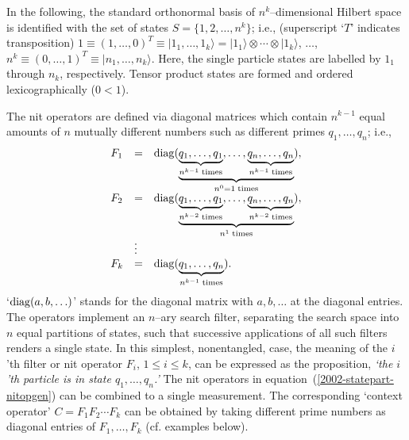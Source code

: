 \documentclass{article}
\begin{document}
In the following, the standard orthonormal basis of
$n^k$--dimensional Hilbert space is identified with the set of states $S=\{1,2,\ldots ,n^k\}$; i.e.,
(superscript `$T$' indicates transposition)
$
1 \equiv (1,\ldots,0)^T\equiv \mid 1_1,\ldots ,1_k\rangle = \mid 1_1\rangle \otimes \cdots \otimes \mid 1_k\rangle
$,
$\ldots $,
$
n^k \equiv (0,\ldots,1)^T\equiv \mid n_1,\ldots ,n_k\rangle
$.
Here, the single particle states are labelled by $1_1$ through $n_k$, respectively.
Tensor product states are formed and ordered lexicographically ($0<1$).


The nit operators are defined via diagonal matrices
which contain $n^{k-1}$ equal amounts of $n$ mutually different numbers
such as different primes $q_1,\ldots ,q_n$; i.e.,
\begin{equation}
\begin{array}{llll}
F_1&=& {\rm diag} (\underbrace{\underbrace{q_1,\ldots ,q_1}_{n^{k-1}\;{\rm times}},\ldots ,\underbrace{q_n,\ldots ,q_n}_{n^{k-1}\;{\rm times}}}_{n^0=1\;{\rm times}}),\\
F_2&=& {\rm diag} (\underbrace{\underbrace{q_1,\ldots ,q_1}_{n^{k-2}\;{\rm times}},\ldots ,\underbrace{q_n,\ldots ,q_n}_{n^{k-2}\;{\rm times}}}_{n^1\;{\rm times}}),\\
  &\vdots&\\
F_k&=& {\rm diag} (\underbrace{q_1,\ldots ,q_n}_{n^{k-1}\;{\rm times}}).
\end{array}
\label{2002-statepart-nitopgen}
\end{equation}
`${\rm diag}(a,b,\ldots )$' stands for the diagonal matrix with $a,b,\ldots $
at the diagonal entries.
The operators implement an $n$--ary search filter,
separating the search space into $n$ equal partitions of states,
such that successive applications of all such filters
renders a single state.
In this simplest, nonentangled, case,
the meaning of the $i$'th filter or nit operator $F_i$, $1\le i\le k$,
can be expressed as the proposition,
{\em `the $i$'th particle is in state $q_1, \ldots ,q_n$.'}
The nit operators in equation~(\ref{2002-statepart-nitopgen}) can be combined to a single
measurement. The corresponding `context operator' $C=F_1 F_2 \cdots F_k$ can be obtained by
taking different prime numbers as diagonal entries of $F_1,\ldots , F_k$ (cf. examples below).
\end{document}
